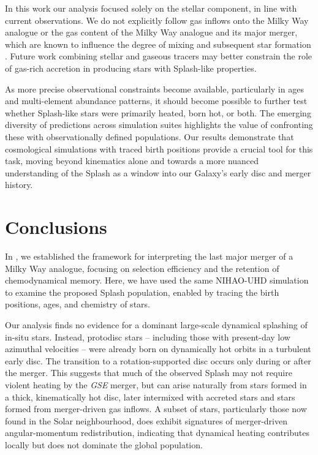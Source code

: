 \documentclass[fleqn,usenatbib]{mnras}
\begin{document}
In this work our analysis focused solely on the stellar component, in line with current observations. We do not explicitly follow gas inflows onto the Milky Way analogue or the gas content of the Milky Way analogue and its major merger, which are known to influence the degree of mixing and subsequent star formation \citep[e.g.][]{Cooper2015, Agertz2021, Renaud2021b, Buck2023, TepperGarcia2024}. Future work combining stellar and gaseous tracers may better constrain the role of gas-rich accretion in producing stars with Splash-like properties.

As more precise observational constraints become available, particularly in ages and multi-element abundance patterns, it should become possible to further test whether Splash-like stars were primarily heated, born hot, or both. The emerging diversity of predictions across simulation suites \citep{Brooks2026} highlights the value of confronting these with observationally defined populations. Our results demonstrate that cosmological simulations with traced birth positions provide a crucial tool for this task, moving beyond kinematics alone and towards a more nuanced understanding of the Splash as a window into our Galaxy's early disc and merger history.

\section{Conclusions}
\label{sec:conclusions}

In , we established the framework for interpreting the last major merger of a Milky Way analogue, focusing on selection efficiency and the retention of chemodynamical memory. Here, we have used the same NIHAO-UHD simulation to examine the proposed Splash population, enabled by tracing the birth positions, ages, and chemistry of stars.

Our analysis finds no evidence for a dominant large-scale dynamical splashing of in-situ stars. Instead, protodisc stars -- including those with present-day low azimuthal velocities -- were already born on dynamically hot orbits in a turbulent early disc. The transition to a rotation-supported disc occurs only during or after the merger. This suggests that much of the observed Splash may not require violent heating by the \textit{GSE} merger, but can arise naturally from stars formed in a thick, kinematically hot disc, later intermixed with accreted stars and stars formed from merger-driven gas inflows. A subset of stars, particularly those now found in the Solar neighbourhood, does exhibit signatures of merger-driven angular-momentum redistribution, indicating that dynamical heating contributes locally but does not dominate the global population.
\end{document}
